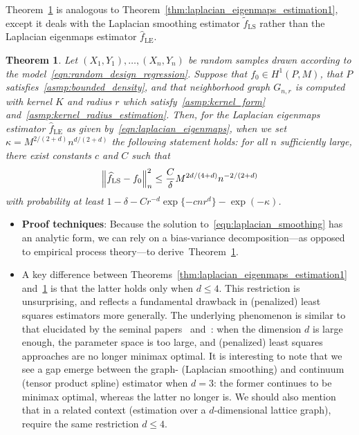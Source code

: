 \documentclass{article}
\newcommand{\1}{\mathbf{1}}
\newcommand{\wt}[1]{\widetilde{#1}}
\newcommand{\wh}[1]{\widehat{#1}}
\newcommand{\LE}{\mathrm{LE}}
\newcommand{\LS}{\mathrm{LS}}
\theoremstyle{alden}
\theoremstyle{aldenthm}
\newtheorem{theorem}{Theorem}
\theoremstyle{definition}
\theoremstyle{remark}
\begin{document}
Theorem~\ref{thm:laplacian_smoothing_estimation1} is analogous to Theorem~\ref{thm:laplacian_eigenmaps_estimation1}, except it deals with the Laplacian smoothing estimator $\wt{f}_{\LS}$ rather than the Laplacian eigenmaps estimator $\wh{f}_{\LE}$.   
\begin{theorem}
	\label{thm:laplacian_smoothing_estimation1}
	Let $(X_1,Y_1),\ldots,(X_n,Y_n)$ be random samples drawn according to the model~\eqref{eqn:random_design_regression}. Suppose that $f_0 \in H^1(P,M)$, that $P$ satisfies~\ref{asmp:bounded_density}, and that neighborhood graph $G_{n,r}$ is computed with kernel $K$ and radius $r$ which satisfy~\ref{asmp:kernel_form} and~\ref{asmp:kernel_radius_estimation}. Then, for the Laplacian eigenmaps estimator $\wh{f}_{\LE}$ as given by~\eqref{eqn:laplacian_eigenmaps}, when we set $\kappa = M^{2/(2 + d)}n^{d/(2 + d)}$ the following statement holds: for all $n$ sufficiently large, there exist constants $c$ and $C$ such that
	\begin{equation*}
	\Bigl\|\wh{f}_{\LS} - f_0\Bigr\|_n^2 \leq \frac{C}{\delta} M^{2d/(4 + d)} n^{-2/(2 + d)}
	\end{equation*}
	with probability at least $1 - \delta -  Cr^{-d}\exp\{-cnr^d\} - \exp(-\kappa)$.
\end{theorem}

\begin{itemize}
	\item \textbf{Proof techniques}: Because the solution to~\eqref{eqn:laplacian_smoothing} has an analytic form, we can rely on a bias-variance decomposition---as opposed to empirical process theory---to derive~Theorem~\ref{thm:laplacian_smoothing_estimation1}.
	\item A key difference between Theorems~\ref{thm:laplacian_eigenmaps_estimation1} and~\ref{thm:laplacian_smoothing_estimation1} is that the latter holds only when $d \leq 4$. This restriction is unsurprising, and reflects a fundamental drawback in (penalized) least squares estimators more generally. The underlying phenomenon is similar to that elucidated by the seminal papers~\cite{birge1993} and~\cite{birge1998}: when the dimension $d$ is large enough, the parameter space is too large, and (penalized) least squares approaches are no longer minimax optimal. It is interesting to note that we see a gap emerge between the graph- (Laplacian smoothing) and continuum (tensor product spline) estimator when $d = 3$: the former continues to be minimax optimal, whereas the latter no longer is. We should also mention that in a related context (estimation over a $d$-dimensional lattice graph), \cite{sadhanala2016} require the same restriction $d \leq 4$. 
\end{itemize}
\end{document}
